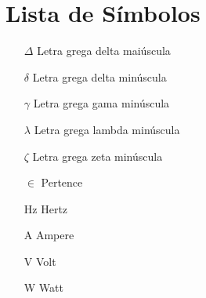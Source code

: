 \chapter*{Lista de Símbolos}
\thispagestyle{empty} %

\begin{itemize}
	\item[$ \Delta $] \qquad Letra grega delta maiúscula
	\item[$ \delta $] \qquad Letra grega delta minúscula
	\item[$ \gamma $] \qquad Letra grega gama minúscula
	\item[$ \lambda $] \qquad Letra grega lambda minúscula
	\item[$ \zeta $] \qquad Letra grega zeta minúscula
	\item[$ \in $] \qquad Pertence
	\item[ Hz ] \qquad Hertz
	\item[ A ] \qquad Ampere
	\item[ V ] \qquad Volt
	\item[ W ] \qquad Watt
\end{itemize}